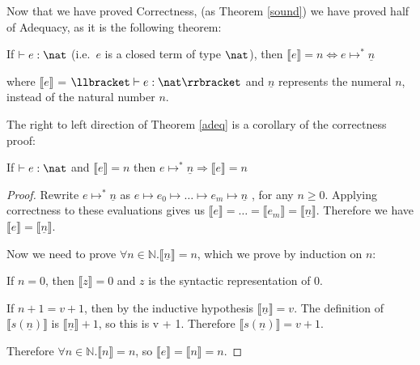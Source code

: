 Now that we have proved Correctness, (as Theorem \ref{sound}) we have proved half of Adequacy, as it is the following theorem:

\vspace{0.5cm}

\begin{thm}\label{adeq}
If $\vdash e : \nat$ (i.e.\ $e$ is a closed term of type $\nat$), then $\llbracket e \rrbracket = n \Leftrightarrow e \mapsto^* \underline{n}$
\end{thm}

where $\llbracket e \rrbracket$ = $\llbracket \vdash e : \nat \rrbracket$ and $\underline{n}$ represents the numeral $n$, instead of the natural number $n$.

The right to left direction of Theorem \ref{adeq} is a corollary of the correctness proof:

\vspace{0.5cm}

\begin{cor}
If $\vdash e : \nat$ and $\llbracket e \rrbracket = n$ then $e \mapsto^* \underline{n} \Rightarrow \llbracket e \rrbracket = n$
\end{cor}


\begin{proof}
Rewrite $e \mapsto^* \underline{n}$ as $e \mapsto e_0 \mapsto \dots \mapsto e_m \mapsto \underline{n}$ , for any $n \geq 0$. Applying correctness to these evaluations gives us $\llbracket e\rrbracket = \dots = \llbracket e_m \rrbracket = \llbracket \underline{n} \rrbracket$. Therefore we have $\llbracket  e \rrbracket = \llbracket \underline{n} \rrbracket$.

Now we need to prove $\forall n \in \mathbb{N}. \llbracket \underline{n} \rrbracket = n$, which we prove by induction on $n$:

If $n = 0$, then $\llbracket z \rrbracket = 0$ and $z$ is the syntactic representation of 0.


If $n + 1 = v + 1$, then by the inductive hypothesis $\llbracket \underline{n} \rrbracket = v$. The definition of $\llbracket s(\underline{n}) \rrbracket$ is $\llbracket  \underline{n} \rrbracket + 1$, so this is v + 1. Therefore $\llbracket s(\underline{n}) \rrbracket = v + 1$.


Therefore $\forall n \in \mathbb{N}. \llbracket n \rrbracket  = n$, so $\llbracket e \rrbracket =  \llbracket n \rrbracket  = n$.

\end{proof}


